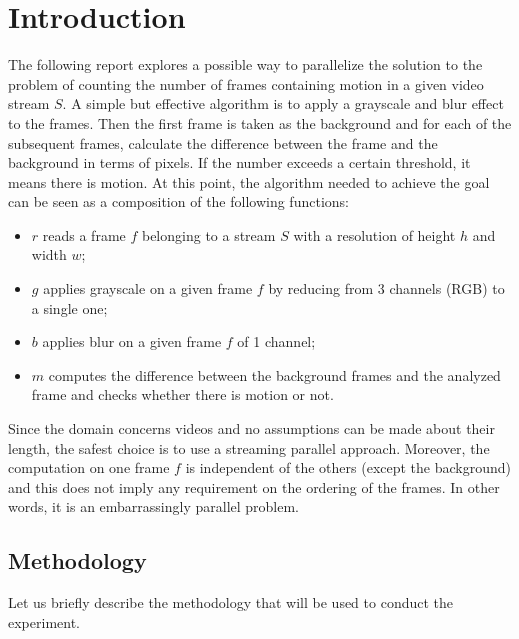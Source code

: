 \section{Introduction}
The following report explores a possible way to parallelize the solution to the problem of counting the number of frames containing motion in a given video stream $S$.
A simple but effective algorithm is to apply a grayscale and blur effect to the frames. Then the first frame is taken as the background and for each of the subsequent frames, calculate the difference between the frame and the background in terms of pixels. If the number exceeds a certain threshold, it means there is motion.
At this point, the algorithm needed to achieve the goal can be seen as a composition of the following functions:
\begin{itemize}
	\item $r$ reads a frame $f$ belonging to a stream $S$ with a resolution of height $h$ and width $w$;
	\item $g$ applies grayscale on a given frame $f$ by reducing from 3 channels (RGB) to a single one;
	\item $b$ applies blur on a given frame $f$ of 1 channel;
	\item $m$ computes the difference between the background frames and the analyzed frame and checks whether there is motion or not.
\end{itemize}

Since the domain concerns videos and no assumptions can be made about their length, the safest choice is to use a streaming parallel approach. Moreover, the computation on one frame $f$ is independent of the others (except the background) and this does not imply any requirement on the ordering of the frames. In other words, it is an embarrassingly parallel problem. 

\subsection{Methodology}
\label{sec:methodology}
Let us briefly describe the methodology that will be used to conduct the experiment. 

